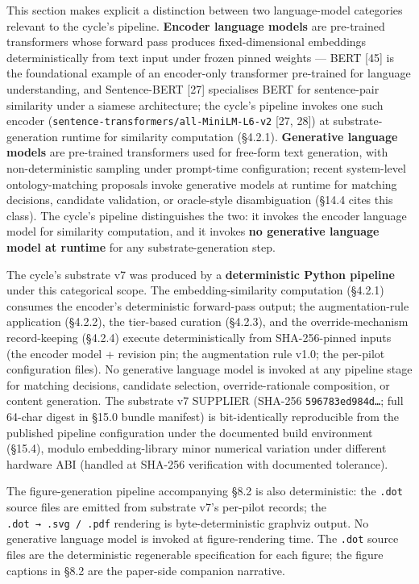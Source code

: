 \documentclass[
]{article}
\begin{document}
This section makes explicit a distinction between two language-model
categories relevant to the cycle's pipeline. \textbf{Encoder language
models} are pre-trained transformers whose forward pass produces
fixed-dimensional embeddings deterministically from text input under
frozen pinned weights --- BERT {[}45{]} is the foundational example of
an encoder-only transformer pre-trained for language understanding, and
Sentence-BERT {[}27{]} specialises BERT for sentence-pair similarity
under a siamese architecture; the cycle's pipeline invokes one such
encoder (\texttt{sentence-transformers/all-MiniLM-L6-v2} {[}27, 28{]})
at substrate-generation runtime for similarity computation (§4.2.1).
\textbf{Generative language models} are pre-trained transformers used
for free-form text generation, with non-deterministic sampling under
prompt-time configuration; recent system-level ontology-matching
proposals invoke generative models at runtime for matching decisions,
candidate validation, or oracle-style disambiguation (§14.4 cites this
class). The cycle's pipeline distinguishes the two: it invokes the
encoder language model for similarity computation, and it invokes
\textbf{no generative language model at runtime} for any
substrate-generation step.

The cycle's substrate v7 was produced by a \textbf{deterministic Python
pipeline} under this categorical scope. The embedding-similarity
computation (§4.2.1) consumes the encoder's deterministic forward-pass
output; the augmentation-rule application (§4.2.2), the tier-based
curation (§4.2.3), and the override-mechanism record-keeping (§4.2.4)
execute deterministically from SHA-256-pinned inputs (the encoder model
+ revision pin; the augmentation rule v1.0; the per-pilot configuration
files). No generative language model is invoked at any pipeline stage
for matching decisions, candidate selection, override-rationale
composition, or content generation. The substrate v7 SUPPLIER (SHA-256
\texttt{596783ed984d…}; full 64-char digest in §15.0 bundle manifest) is
bit-identically reproducible from the published pipeline configuration
under the documented build environment (§15.4), modulo embedding-library
minor numerical variation under different hardware ABI (handled at
SHA-256 verification with documented tolerance).

The figure-generation pipeline accompanying §8.2 is also deterministic:
the \texttt{.dot} source files are emitted from substrate v7's per-pilot
records; the \texttt{.dot\ →\ .svg\ /\ .pdf} rendering is
byte-deterministic graphviz output. No generative language model is
invoked at figure-rendering time. The \texttt{.dot} source files are the
deterministic regenerable specification for each figure; the figure
captions in §8.2 are the paper-side companion narrative.
\end{document}
